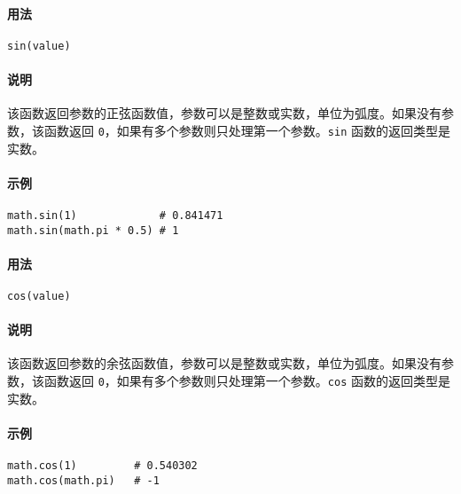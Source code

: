 
\paragraph{用法}
\begin{lstlisting}[language=berry, numbers=none]
sin(value)
\end{lstlisting}

\paragraph{说明}
该函数返回参数的正弦函数值，参数可以是整数或实数，单位为弧度。如果没有参数，该函数返回 \texttt{0}，如果有多个参数则只处理第一个参数。\texttt{sin} 函数的返回类型是实数。

\paragraph{示例}
\begin{lstlisting}[language=berry, numbers=none]
math.sin(1)             # 0.841471
math.sin(math.pi * 0.5) # 1
\end{lstlisting}


\paragraph{用法}
\begin{lstlisting}[language=berry, numbers=none]
cos(value)
\end{lstlisting}

\paragraph{说明}
该函数返回参数的余弦函数值，参数可以是整数或实数，单位为弧度。如果没有参数，该函数返回 \texttt{0}，如果有多个参数则只处理第一个参数。\texttt{cos} 函数的返回类型是实数。

\paragraph{示例}
\begin{lstlisting}[language=berry, numbers=none]
math.cos(1)         # 0.540302
math.cos(math.pi)   # -1
\end{lstlisting}

